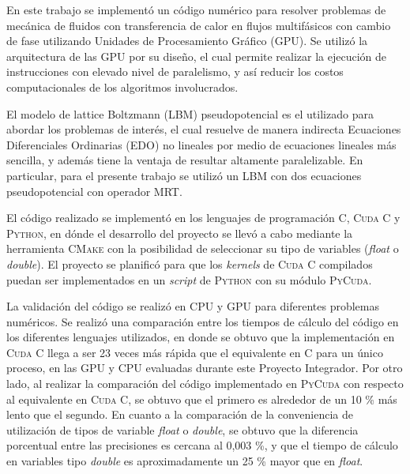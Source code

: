 \begin{resumen}%

En este trabajo se implementó un código numérico para resolver problemas de mecánica de fluidos con transferencia de calor en flujos multifásicos con cambio de fase utilizando Unidades de Procesamiento Gráfico (GPU). Se utilizó la arquitectura de las GPU por su diseño, el cual permite realizar la ejecución de instrucciones con elevado nivel de paralelismo, y así reducir los costos computacionales de los algoritmos involucrados.

El modelo de lattice Boltzmann (LBM) pseudopotencial es el utilizado para abordar los problemas de interés, el cual resuelve de manera indirecta Ecuaciones Diferenciales Ordinarias (EDO) no lineales por medio de ecuaciones lineales más sencilla, y además tiene la ventaja de resultar altamente paralelizable. En particular, para el presente trabajo se utilizó un LBM con dos ecuaciones pseudopotencial con operador MRT.

El código realizado se implementó en los lenguajes de programación \textsc{C}, \textsc{Cuda C} y \textsc{Python}, en dónde el desarrollo del proyecto se llevó a cabo mediante la herramienta \textsc{CMake} con la posibilidad de seleccionar su tipo de variables (\textit{float} o \textit{double}). El proyecto se planificó para que los \textit{kernels} de \textsc{Cuda C} compilados puedan ser implementados en un \textit{script} de \textsc{Python} con su módulo \textsc{PyCuda}.

La validación del código se realizó en CPU y GPU para diferentes problemas numéricos. Se realizó una comparación entre los tiempos de cálculo del código en los diferentes lenguajes utilizados, en donde se obtuvo que la implementación en \textsc{Cuda C} llega a ser 23 veces más rápida que el equivalente en \textsc{C} para un único proceso, en las GPU y CPU evaluadas durante este Proyecto Integrador. Por otro lado, al realizar la comparación del código implementado en \textsc{PyCuda} con respecto al equivalente en \textsc{Cuda C}, se obtuvo que el primero es alrededor de un 10 \% más lento que el segundo. En cuanto a la comparación de la conveniencia de utilización de tipos de variable \textit{float} o \textit{double}, se obtuvo que la diferencia porcentual entre las  precisiones es cercana al 0,003 \%, y que el tiempo de cálculo en variables tipo \textit{double} es aproximadamente un 25 \% mayor que en \textit{float}.



\end{resumen}

